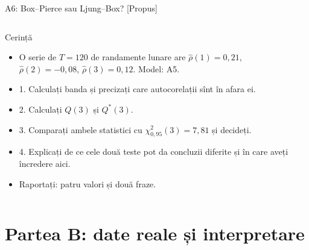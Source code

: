 \begin{frame}{A6: Box--Pierce sau Ljung--Box? [Propus]}
\propsub
\itemsize{\scriptsize}
\begin{columns}[T]
\begin{column}{\taskw}
\begin{block}{Cerință}
\begin{itemize}
    \item O serie de $T = 120$ de randamente lunare are $\hat\rho(1) = 0{,}21$, $\hat\rho(2) = -0{,}08$, $\hat\rho(3) = 0{,}12$. Model: A5.
    \item 1. Calculați banda și precizați care autocorelații sînt în afara ei.
    \item 2. Calculați $Q(3)$ și $Q^*(3)$.
    \item 3. Comparați ambele statistici cu $\chi^2_{0{,}95}(3) = 7{,}81$ și decideți.
    \item 4. Explicați de ce cele două teste pot da concluzii diferite și în care aveți încredere aici.
    \item Raportați: patru valori și două fraze.
\end{itemize}
\end{block}
\end{column}
\begin{column}{\solw}
\end{column}
\end{columns}
\end{frame}


\section{Partea B: date reale și interpretare}

